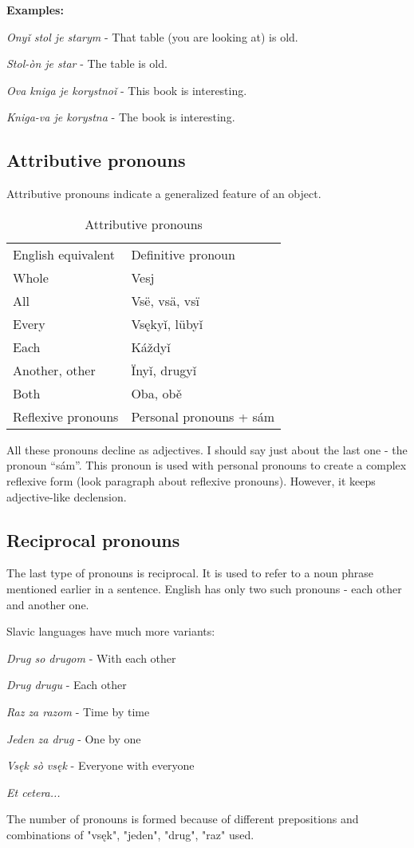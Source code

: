 \textbf{Examples:}

\textit{Onyǐ stol je starym} - That table (you are looking at) is old.

\textit{Stol-òn je star} - The table is old.

\textit{Ova kniga je korystnoǐ} - This book is interesting.

\textit{Kniga-va je korystna} - The book is interesting.

\subsection{Attributive pronouns}

Attributive pronouns indicate a generalized feature of an object. 

\begin{table}[!htb]
	\caption{Attributive pronouns}
	\begin{tabular}{ll}
		English equivalent & Definitive pronoun \\
		Whole & Vesj \\
		All & Vsë, vsä, vsï \\
		Every & Vsękyǐ, lübyǐ \\
		Each & Káždyǐ \\
		Another, other & Ïnyǐ, drugyǐ \\
		Both & Oba, obě \\
		Reflexive pronouns & Personal pronouns + sám
	\end{tabular}
\end{table}

All these pronouns decline as adjectives. I should say just about the last one - the pronoun “sám”. This pronoun is used with personal pronouns to create a complex reflexive form (look paragraph about reflexive pronouns). However, it keeps adjective-like declension.

\subsection{Reciprocal pronouns}


The last type of pronouns is reciprocal. It is used to refer to a noun phrase mentioned earlier in a sentence. English has only two such pronouns - each other and another one.

Slavic languages have much more variants:

\textit{Drug so drugom} - With each other

\textit{Drug drugu} - Each other

\textit{Raz za razom} - Time by time

\textit{Jeden za drug} - One by one

\textit{Vsęk sò vsęk} - Everyone with everyone

\textit{Et cetera...}

The number of pronouns is formed because of different prepositions and combinations of "vsęk", "jeden", "drug", "raz" used.
